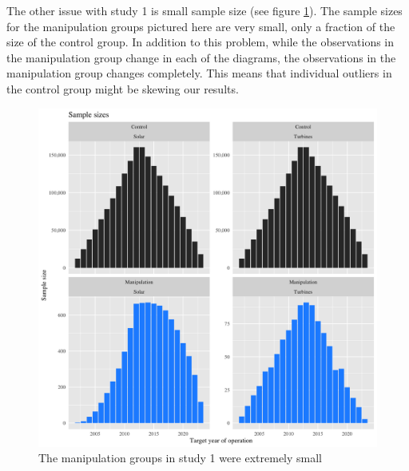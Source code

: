 \documentclass{article}
\begin{document}
The other issue with study 1 is small sample size (see figure \ref{study1samplesize}). 
The sample sizes for the manipulation groups pictured here are very small, only a fraction of the size of the control group.
In addition to this problem, while the observations in the manipulation group change in each of the diagrams, the observations in the manipulation group changes completely. 
This means that individual outliers in the control group might be skewing our results.
\begin{figure}[h]
\centering
\includegraphics[width=0.9\linewidth]
{study1_sample_size.png} 
\caption{The manipulation groups in study 1 were extremely small}
\label{study1samplesize}
\end{figure}
\end{document}

